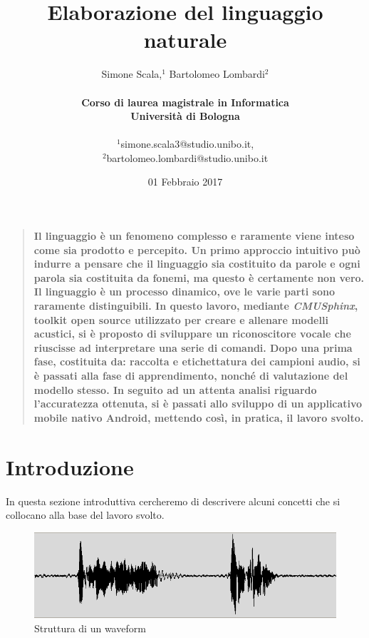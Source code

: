 \documentclass[12pt]{article}
\title{Elaborazione del linguaggio naturale}
\author{Simone Scala,$^{1}$ Bartolomeo Lombardi$^{2}$\\
    \\
    \textbf{Corso di laurea magistrale in Informatica} \\
    \textbf{Università di Bologna}
    \\\\
    \normalsize{$^{1}$simone.scala3@studio.unibo.it,}\\
    \normalsize{$^{2}$bartolomeo.lombardi@studio.unibo.it}\\
}
\date{01 Febbraio 2017}
\newenvironment{sciabstract}{%
\begin{quote} \bf}
{\end{quote}}
\begin{document}
 


\baselineskip 24pt

\maketitle 

\begin{sciabstract}
  Il linguaggio è un fenomeno complesso e raramente viene inteso come sia prodotto e percepito. Un primo approccio intuitivo può indurre a pensare che il linguaggio sia costituito da parole e ogni parola sia costituita da fonemi, ma questo è certamente non vero. Il linguaggio è un processo dinamico, ove le varie parti sono raramente distinguibili. In questo lavoro, mediante \textit{CMUSphinx}, toolkit open source utilizzato per creare e allenare modelli acustici, si è proposto di sviluppare un riconoscitore vocale che riuscisse ad interpretare una serie di comandi. Dopo una prima fase, costituita da: raccolta e etichettatura dei campioni audio, si è passati alla fase di apprendimento, nonché di valutazione del modello stesso. In seguito ad un attenta analisi riguardo l'accuratezza ottenuta, si è passati allo sviluppo di un applicativo mobile nativo Android, mettendo così, in pratica, il lavoro svolto.
\end{sciabstract}

\newpage
\tableofcontents
\newpage

\section{Introduzione}
    In questa sezione introduttiva cercheremo di descrivere alcuni concetti che si collocano alla base del lavoro svolto.
    
    \begin{figure}
            \centering
            \includegraphics[scale=0.5]{waveform}
            \caption{Struttura di un waveform}
            \label{fig:first}
     \end{figure}
\end{document}
